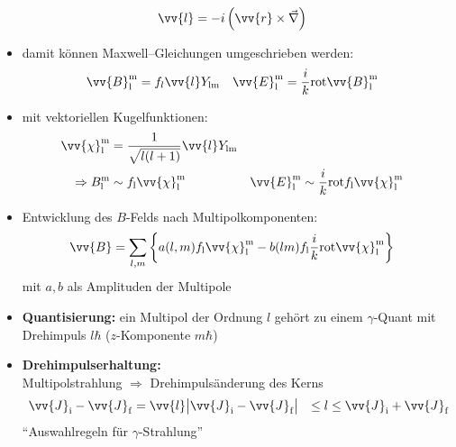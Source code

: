 \documentclass[BCOR=5mm,DIV=calc,listof=totoc,headings=big]{scrartcl}
\newcommand{\nab}{\vec{\nabla}}
\begin{document}
\begin{itemize}
\begin{align*}
    \vv{l}&=-i \del{\vv{r} \times \nab}
  \end{align*}
\item damit können Maxwell--Gleichungen umgeschrieben werden:
  \begin{align*}
    \vv{B}_{\mathrm{l}}^{\mathrm{m}}&=f_{l} \vv{l} Y_{\mathrm{lm}} &
    \vv{E}_{\mathrm{l}}^{\mathrm{m}}&=\frac{i}{k} \text{rot} \vv{B}_{\mathrm{l}}^{\mathrm{m}}
  \end{align*}
\item mit vektoriellen Kugelfunktionen:
  \begin{align*}
    \vv{\chi}_{\mathrm{l}}^{\mathrm{m}}&=\frac{1}{\sqrt{l(l+1)}}
    \vv{l} Y_{\mathrm{lm}}\\
    \Rightarrow B_{\mathrm{l}}^{\mathrm{m}} &\sim f_{\mathrm{l}}
    \vv{\chi}_{\mathrm{l}}^{\mathrm{m}} &
    \vv{E}_{\mathrm{l}}^{\mathrm{m}}&\sim \frac{i}{k} \text{rot} f_{\mathrm{l}}
    \vv{\chi}_{\mathrm{l}}^{\mathrm{m}}
  \end{align*}
\item Entwicklung des $B$-Felds nach Multipolkomponenten:
  \begin{align*}
    \vv{B}&=\sum_{l,m}
    \left\{a(l,m)f_{\mathrm{l}}\vv{\chi}_{\mathrm{l}}^{\mathrm{m}}-b(lm)f_{\mathrm{l}}
    \frac{i}{k} \text{rot} \vv{\chi}_{\mathrm{l}}^{\mathrm{m}} \right\}
  \end{align*}
  mit $a, b$ als Amplituden der Multipole
\item \textbf{Quantisierung:} ein Multipol der Ordnung $l$ gehört zu
  einem $\gamma$-Quant mit Drehimpuls $l\hbar$ ($z$-Komponente $m\hbar$)
\item \textbf{Drehimpulserhaltung:}\\
  Multipolstrahlung $\Rightarrow$ Drehimpulsänderung des Kerns
  \begin{align*}
    \vv{J}_{\mathrm{i}}-\vv{J}_{\mathrm{f}}&=\vv{l}
    \abs{\vv{J}_{\mathrm{i}}-\vv{J}_{\mathrm{f}}}&\leq l \leq \vv{J}_{\mathrm{i}}+\vv{J}_{\mathrm{f}}
  \end{align*}
  "`Auswahlregeln für $\gamma$-Strahlung"'
\end{itemize}
\end{document}
